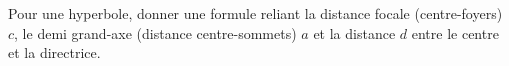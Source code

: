 Pour une hyperbole, donner une formule reliant la distance focale (centre-foyers) $c$, le demi grand-axe (distance centre-sommets) $a$ et la distance $d$ entre le centre et la directrice.
\bigskip
